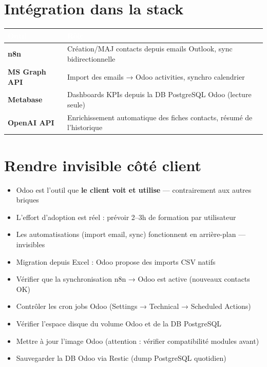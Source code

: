 \documentclass[11pt, a4paper]{article}
\begin{document}
\section{Intégration dans la stack}

\begin{center}
\renewcommand{\arraystretch}{1.4}
\begin{tabularx}{\linewidth}{>{\bfseries}p{2.8cm} X}
\toprule
\rowcolor{tabheader}
\textcolor{white}{\textbf{Outil}} & \textcolor{white}{\textbf{Rôle}} \\
\midrule
n8n & Création/MAJ contacts depuis emails Outlook, sync bidirectionnelle \\
\rowcolor{rowgray}
MS Graph API & Import des emails → Odoo activities, synchro calendrier \\
Metabase & Dashboards KPIs depuis la DB PostgreSQL Odoo (lecture seule) \\
\rowcolor{rowgray}
OpenAI API & Enrichissement automatique des fiches contacts, résumé de l'historique \\
\bottomrule
\end{tabularx}
\end{center}

\section{Rendre invisible côté client}

\begin{itemize}
  \item Odoo est l'outil que \textbf{le client voit et utilise} — contrairement aux autres briques
  \item L'effort d'adoption est réel : prévoir 2–3h de formation par utilisateur
  \item Les automatisations (import email, sync) fonctionnent en arrière-plan — invisibles
  \item Migration depuis Excel : Odoo propose des imports CSV natifs
\end{itemize}

\begin{checklist}
  \begin{itemize}
    \item[$\square$] Vérifier que la synchronisation n8n → Odoo est active (nouveaux contacts OK)
    \item[$\square$] Contrôler les cron jobs Odoo (Settings → Technical → Scheduled Actions)
    \item[$\square$] Vérifier l'espace disque du volume Odoo et de la DB PostgreSQL
    \item[$\square$] Mettre à jour l'image Odoo (attention : vérifier compatibilité modules avant)
    \item[$\square$] Sauvegarder la DB Odoo via Restic (dump PostgreSQL quotidien)
  \end{itemize}
\end{checklist}
\end{document}

